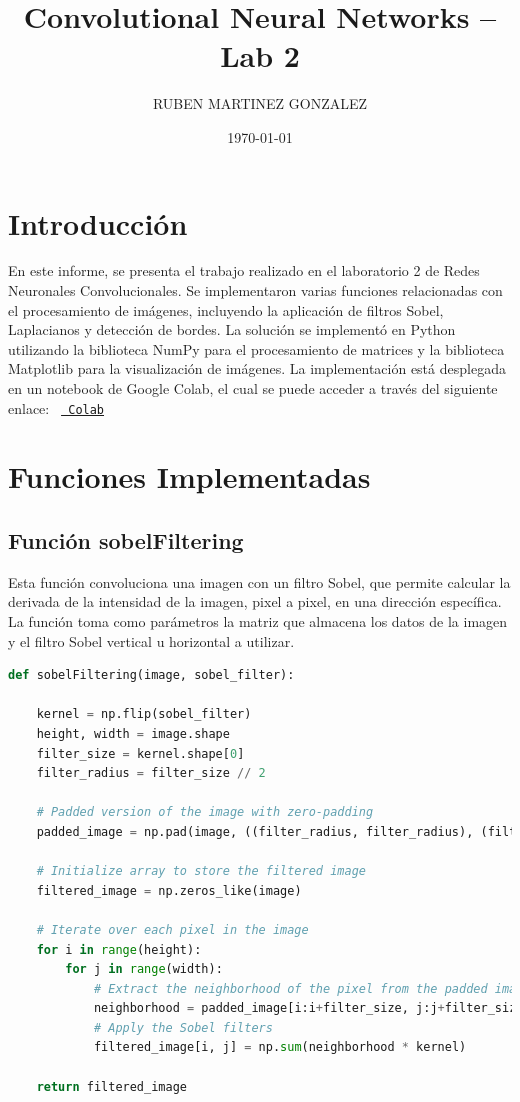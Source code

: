\documentclass{article}
\title{Convolutional Neural Networks – Lab 2}
\author{RUBEN MARTINEZ GONZALEZ}
\date{\today}
\begin{document}
    
    \maketitle
    
    
    \section{Introducción}
    \noindent
    En este informe, se presenta el trabajo realizado en el laboratorio 2 de Redes Neuronales Convolucionales.
    Se implementaron varias funciones relacionadas con el procesamiento de imágenes, incluyendo la aplicación de filtros Sobel, Laplacianos y detección de bordes.
    \noindent
    La solución se implementó en Python utilizando la biblioteca NumPy para el procesamiento de matrices y la biblioteca Matplotlib para la visualización de imágenes.
    La implementación está desplegada en un notebook de Google Colab, el cual se puede acceder a través del siguiente enlace:
    \texttt{%
        \href{https://colab.research.google.com/drive/1mX1coUf6sMoXGxgJmwHw3ILxTfAp5YeC#scrollTo=GDOnpOSTqdGX}{%
            Colab}%
    }
    
    
    \section{Funciones Implementadas}
    
    \subsection{Función sobelFiltering}\label{subsec:funcion-sobelfiltering}
    \noindent
    Esta función convoluciona una imagen con un filtro Sobel, que permite calcular la derivada de la intensidad de la imagen, pixel a pixel, en una dirección específica.
    La función toma como parámetros la matriz que almacena los datos de la imagen y el filtro Sobel vertical u horizontal a utilizar.
    
    \begin{lstlisting}[language=Python, caption={Implementación sobelfiltering},label={lst:sobelFiltering}]
def sobelFiltering(image, sobel_filter):

    kernel = np.flip(sobel_filter)
    height, width = image.shape
    filter_size = kernel.shape[0]
    filter_radius = filter_size // 2

    # Padded version of the image with zero-padding
    padded_image = np.pad(image, ((filter_radius, filter_radius), (filter_radius, filter_radius)), mode='constant')

    # Initialize array to store the filtered image
    filtered_image = np.zeros_like(image)

    # Iterate over each pixel in the image
    for i in range(height):
        for j in range(width):
            # Extract the neighborhood of the pixel from the padded image
            neighborhood = padded_image[i:i+filter_size, j:j+filter_size]
            # Apply the Sobel filters
            filtered_image[i, j] = np.sum(neighborhood * kernel)

    return filtered_image
    \end{lstlisting}
    
\end{document}
